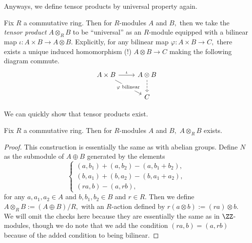 \documentclass[../notes.tex]{subfiles}
\begin{document}
Anyways, we define tensor products by universal property again.
\begin{definition}
	Fix $R$ a commutative ring. Then for $R$-modules $A$ and $B,$ then we take the \textit{tensor product} $A\otimes_RB$ to be ``universal'' as an $R$-module equipped with a bilinear map $\iota:A\times B\to A\otimes B.$ Explicitly, for any bilinear map $\varphi:A\times B\to C,$ there exists a unique induced homomorphism (!) $A\otimes B\to C$ making the following diagram commute.
	\[\begin{tikzcd}
		{A\times B} & {A\otimes B} \\
		& C
		\arrow["{\varphi\text{ bilinear}}"{description}, from=1-1, to=2-2]
		\arrow[dashed, from=1-2, to=2-2]
		\arrow["\iota", from=1-1, to=1-2]
	\end{tikzcd}\]
\end{definition}
We can quickly show that tensor products exist.
\begin{prop}
	Fix $R$ a commutative ring. Then for $R$-modules $A$ and $B,$ $A\otimes_RB$ exists.
\end{prop}
\begin{proof}
	This construction is essentially the same as with abelian groups. Define $N$ as the submodule of $A\oplus B$ generated by the elements
	\[\begin{cases}
		(a,b_1)+(a,b_2)-(a,b_1+b_2), \\
		(b,a_1)+(b,a_2)-(b,a_1+a_2), \\
		(ra,b) - (a,rb),
	\end{cases}\]
	for any $a,a_1,a_2\in A$ and $b,b_1,b_2\in B$ and $r\in R.$ Then we define $A\otimes_RB:=(A\oplus B)/R,$ with an $R$-action defined by $r(a\otimes b):=(ra)\otimes b.$ We will omit the checks here because they are essentially the same as in $\ZZ$-modules, though we do note that we add the condition $(ra,b)=(a,rb)$ because of the added condition to being bilinear.
\end{proof}
\end{document}
